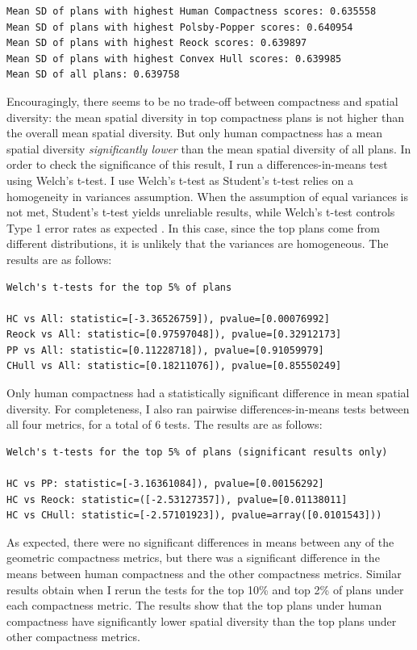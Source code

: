 \documentclass[]{article}
\begin{document}
\begin{verbatim}
Mean SD of plans with highest Human Compactness scores: 0.635558
Mean SD of plans with highest Polsby-Popper scores: 0.640954
Mean SD of plans with highest Reock scores: 0.639897
Mean SD of plans with highest Convex Hull scores: 0.639985
Mean SD of all plans: 0.639758
\end{verbatim}

Encouragingly, there seems to be no trade-off between compactness and
spatial diversity: the mean spatial diversity in top compactness plans
is not higher than the overall mean spatial diversity. But only human
compactness has a mean spatial diversity \emph{significantly lower} than
the mean spatial diversity of all plans. In order to check the
significance of this result, I run a differences-in-means test using
Welch's t-test. I use Welch's t-test as Student's t-test relies on a
homogeneity in variances assumption. When the assumption of equal
variances is not met, Student's t-test yields unreliable results, while
Welch's t-test controls Type 1 error rates as expected
\citep{delacre2017}. In this case, since the top plans come from
different distributions, it is unlikely that the variances are
homogeneous. The results are as follows:

\begin{verbatim}
Welch's t-tests for the top 5% of plans

HC vs All: statistic=[-3.36526759]), pvalue=[0.00076992]
Reock vs All: statistic=[0.97597048]), pvalue=[0.32912173]
PP vs All: statistic=[0.11228718]), pvalue=[0.91059979]
CHull vs All: statistic=[0.18211076]), pvalue=[0.85550249]
\end{verbatim}

Only human compactness had a statistically significant difference in
mean spatial diversity. For completeness, I also ran pairwise
differences-in-means tests between all four metrics, for a total of 6
tests. The results are as follows:

\begin{verbatim}
Welch's t-tests for the top 5% of plans (significant results only)

HC vs PP: statistic=[-3.16361084]), pvalue=[0.00156292]
HC vs Reock: statistic=([-2.53127357]), pvalue=[0.01138011]
HC vs CHull: statistic=[-2.57101923]), pvalue=array([0.0101543]))
\end{verbatim}

As expected, there were no significant differences in means between any
of the geometric compactness metrics, but there was a significant
difference in the means between human compactness and the other
compactness metrics. Similar results obtain when I rerun the tests for
the top 10\% and top 2\% of plans under each compactness metric. The
results show that the top plans under human compactness have
significantly lower spatial diversity than the top plans under other
compactness metrics.
\end{document}
